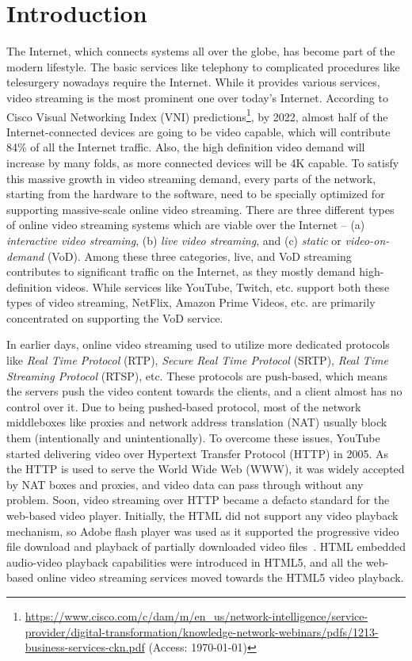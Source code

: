 \section{Introduction}
The Internet, which connects systems all over the globe, has become part of the modern lifestyle. The basic services like telephony to complicated procedures like telesurgery nowadays require the Internet. While it provides various services, video streaming is the most prominent one over today's Internet. According to Cisco Visual Networking Index (VNI) predictions\footnote{\url{https://www.cisco.com/c/dam/m/en_us/network-intelligence/service-provider/digital-transformation/knowledge-network-webinars/pdfs/1213-business-services-ckn.pdf} (Access: \today)}, by 2022, almost half of the Internet-connected devices are going to be video capable, which will contribute 84\% of all the Internet traffic. Also, the high definition video demand will increase by many folds, as more connected devices will be 4K capable. To satisfy this massive growth in video streaming demand, every parts of the network, starting from the hardware to the software, need to be specially optimized for supporting massive-scale online video streaming. There are three different types of online video streaming systems which are viable over the Internet -- (a) \textit{interactive video streaming}, (b) \textit{live video streaming}, and (c) \textit{static} or \textit{video-on-demand} (VoD). Among these three categories, live, and VoD streaming contributes to significant traffic on the Internet, as they mostly demand high-definition videos. While services like YouTube, Twitch, etc. support both these types of video streaming, NetFlix, Amazon Prime Videos, etc. are primarily concentrated on supporting the VoD service. 

In earlier days, online video streaming used to utilize more dedicated protocols like \textit{Real Time Protocol} (RTP), \textit{Secure Real Time Protocol} (SRTP), \textit{Real Time Streaming Protocol} (RTSP), etc. These protocols are push-based, which means the servers push the video content towards the clients, and a client almost has no control over it. Due to being pushed-based protocol, most of the network middleboxes like proxies and network address translation (NAT) usually block them (intentionally and unintentionally). To overcome these issues, YouTube started delivering video over Hypertext Transfer Protocol (HTTP) in 2005. As the HTTP is used to serve the World Wide Web (WWW), it was widely accepted by NAT boxes and proxies, and video data can pass through without any problem. Soon, video streaming over HTTP became a defacto standard for the web-based video player. Initially, the HTML did not support any video playback mechanism, so Adobe flash player was used as it supported the progressive video file download and playback of partially downloaded video files~\cite{gill2007youtube}. HTML embedded audio-video playback capabilities were introduced in HTML5, and all the web-based online video streaming services moved towards the HTML5 video playback.

